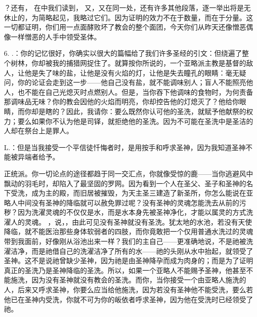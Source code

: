 ？还有， 在中我们读到， 又，又在同一处，还有许多其他段落，逐一举出将是无休止的，为简略起见，我略过它们。因为证明的效力不在于数量，而在于分量。这一切都证明，你们用一点面酵败坏了教会的整个面团，今天你们从昨天还像憎恶偶像一样憎恶的人手中领受圣体。\par

6. .：你的记忆很好，你确实以很大的篇幅给了我们许多圣经的引文：但绕遍了整个树林，你却被我的捕猎网捉住了。就算按你所说的，一个亚略派主教是基督的敌人，让他是失了味的盐，让他是没有火焰的灯，让他是失去瞳孔的眼睛：毫无疑问，你的论证会走到这一步——他自己没有盐，就不能调味别人；盲人不能照亮他人，也不能在自己光熄灭时点燃别人。但是，当你吞下他调味的食物时，为何责备那调味品无味？你的教会因他的火焰而明亮，你却控告他的灯熄灭了？他给你眼睛，而你却是瞎的？因此，我请你：要么既然你认可他的圣洗，就赋予他献祭的权力；要么如果你不认为他是司铎，就拒绝他的圣洗。因为不可能在圣洗中是圣洁的人却在祭台上是罪人。\par

L.：但是当我接受一个平信徒忏悔者时，是用按手和呼求圣神，因为我知道圣神不能被异端者给予。\par

正统派。你一切论点的途径都趋于同一交汇点，你就像受惊的鹿——当你逃避风中飘动的羽毛时，却陷入了最坚固的罗网。因为看到一个人在圣父、圣子和圣神的名下受洗，成为主的殿，而旧居被摧毁，为天主圣三建造了新圣所，你怎么能说在亚略人中间没有圣神的降临就可以赦免罪过呢？没有圣神的灵魂怎能洗去从前的污秽？因为洗濯灵魂的不仅仅是水，而是水本身先被圣神净化，才能以属灵的方式洗濯人的灵魂。 ，说，，由此可见没有圣神就没有圣洗。犹太地的水池，若没有天使降临，就不能医治那些身体软弱者的四肢，而你竟敢把一个仅用普通水洗过的灵魂带到我面前，好像刚从浴池出来一样？我们的主自己——更准确地说，不是祂被洗濯洁净，而是祂借自己的洗濯洁净了所有的水——祂的头刚从水中抬起，就领受了圣神。这不是说祂曾缺少圣神，因为祂是由圣神降孕而成为肉身的；而是为了证明真正的圣洗乃是圣神降临的圣洗。所以，如果一个亚略人不能赐予圣神，他甚至不能施洗，因为没有圣神就没有教会的圣洗。而你，当你接受一个由亚略人施洗的人，后来又呼求圣神，你要么应当给他施洗，因为若没有圣神他不能受洗，要么若他已在圣神内受洗，你就不可为你的皈依者呼求圣神，因为他在受洗时已经领受了祂。\par

